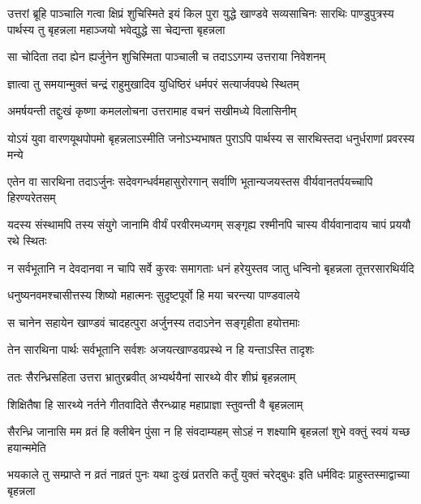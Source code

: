 \onelineshloka
{उत्तरां ब्रूहि पाञ्चालि गत्वा क्षिप्रं शुचिस्मिते}
\threelineshloka
{इयं किल पुरा युद्धे खाण्डवे सव्यसाचिनः}
{सारथिः पाण्डुपुत्रस्य पार्थस्य तु बृहन्नला}
{महाञ्जयो भवेद्युद्धे सा चेद्यन्ता बृहन्नला}



\twolineshloka
{सा चोदिता तदा ह्येन ह्यर्जुनेन शुचिस्मिता}
{पाञ्चाली च तदाऽऽगम्य उत्तराया निवेशनम्}


\twolineshloka
{ज्ञात्वा तु समयान्मुक्तं चन्द्रं राहुमुखादिव}
{युधिष्ठिरं धर्मपरं सत्यार्जवपथे स्थितम्}


\twolineshloka
{अमर्षयन्ती तद्दुःखं कृष्णा कमललोचना}
{उत्तरामाह वचनं सखीमध्ये विलासिनीम्}


\twolineshloka
{योऽयं युवा वारणयूथपोपमो बृहन्नलाऽस्मीति जनोऽभ्यभाषत}
{पुराऽपि पार्थस्य स सारथिस्तदा धनुर्धराणां प्रवरस्य मन्ये}


\twolineshloka
{एतेन वा सारथिना तदाऽर्जुनः सदेवगन्धर्वमहासुरोरगान्}
{सर्वाणि भूतान्यजयस्तस वीर्यवानतर्पयच्चापि हिरण्यरेतसम्}


\twolineshloka
{यदस्य संस्थामपि तस्य संयुगे जानामि वीर्यं परवीरमध्यगम्}
{सङ्गृह्य रश्मीनपि चास्य वीर्यवानादाय चापं प्रययौ रथे स्थितः}


\twolineshloka
{न सर्वभूतानि न देवदानवा न चापि सर्वे कुरवः समागताः}
{धनं हरेयुस्तव जातु धन्विनो बृहन्नला तूत्तरसारथिर्यदि}


\twolineshloka
{धनुष्यनवमश्चासीत्तस्य शिष्यो महात्मनः}
{सुदृष्टपूर्वो हि मया चरन्त्या पाण्डवालये}


\twolineshloka
{स चानेन सहायेन खाण्डवं चादहत्पुरा}
{अर्जुनस्य तदाऽनेन सङ्गृहीता हयोत्तमाः}


\twolineshloka
{तेन सारथिना पार्थः सर्वभूतानि सर्वशः}
{अजयत्खाण्डवप्रस्थे न हि यन्ताऽस्ति तादृशः}



\twolineshloka
{ततः सैरन्ध्रिसहिता उत्तरा भ्रातुरब्रवीत्}
{अभ्यर्थयैनां सारथ्ये वीर शीघ्रं बृहन्नलाम्}


\twolineshloka
{शिक्षितैषा हि सारथ्ये नर्तने गीतवादिते}
{सैरन्ध्य्राह महाप्राज्ञा स्तुवन्ती वै बृहन्नलाम्}




\twolineshloka
{सैरन्ध्रि जानासि मम व्रतं हि क्लीबेन पुंसा न हि संवदाम्यहम्}
{सोऽहं न शक्ष्यामि बृहन्नलां शुभे वक्तुं स्वयं यच्छ हयान्ममेति}




\threelineshloka
{भयकाले तु सम्प्राप्ते न व्रतं नाव्रतं पुनः}
{यथा दुःखं प्रतरति कर्तुं युक्तं चरेद्बुधः}
{इति धर्मविदः प्राहुस्तस्माद्वाच्या बृहन्नला}


